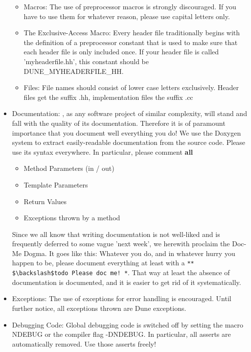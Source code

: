 \begin{itemize}
\begin{itemize}
\item Macros: The use of preprocessor macros is strongly discouraged. If you have to use them for whatever reason, please use capital letters only.
\item The Exclusive-Access Macro: Every header file traditionally begins with the definition of a preprocessor constant that is used to make sure that each header file is only included once. If your header file is called 'myheaderfile.hh', this constant should be DUNE\_MYHEADERFILE\_HH.
\item Files: File names should consist of lower case letters exclusively. Header files get the suffix .hh, implementation files the suffix .cc
\end{itemize}
\item Documentation:
      \Dumux, as any software project of similar complexity, will stand and fall with the quality of its documentation.
Therefore it is of paramount importance that you document well everything you do! We use the Doxygen system to extract easily-readable documentation from the source code. Please use its syntax everywhere. In particular, please comment \textbf{all}
\begin{itemize}
\item Method Parameters (in / out)
\item Template Parameters
\item Return Values 
\item Exceptions thrown by a method
 \end{itemize}
     Since we all know that writing documentation is not well-liked and is frequently deferred to some vague 
'next week', we herewith proclaim the Doc-Me Dogma. It goes like this: Whatever you do, and in whatever hurry you 
happen to be, please document everything at least with a {\verb /** $\backslash$todo Please doc me! */}. That way at least the absence 
of documentation is documented, and it is easier to get rid of it systematically.
\item Exceptions:
      The use of exceptions for error handling is encouraged. Until further notice, all exceptions thrown are Dune exceptions.
\item Debugging Code:
      Global debugging code is switched off by setting the macro NDEBUG or the compiler flag -DNDEBUG. In particular, all asserts are 
automatically removed. Use those asserts freely!
\end{itemize}
